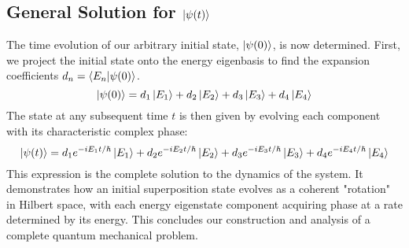 \documentclass[11pt,a4paper]{article}
\begin{document}
\subsection{General Solution for \texorpdfstring{$\ket{\psi(t)}$}{psi(t)}}

The time evolution of our arbitrary initial state, $\ket{\psi(0)}$, is now determined. First, we project the initial state onto the energy eigenbasis to find the expansion coefficients $d_n = \braket{E_n}{\psi(0)}$.
$$
\ket{\psi(0)} = d_1\ket{E_1} + d_2\ket{E_2} + d_3\ket{E_3} + d_4\ket{E_4}
$$
The state at any subsequent time $t$ is then given by evolving each component with its characteristic complex phase:
$$
\ket{\psi(t)} = d_1 e^{-iE_1 t/\hbar}\ket{E_1} + d_2 e^{-iE_2 t/\hbar}\ket{E_2} + d_3 e^{-iE_3 t/\hbar}\ket{E_3} + d_4 e^{-iE_4 t/\hbar}\ket{E_4}
$$
This expression is the complete solution to the dynamics of the system. It demonstrates how an initial superposition state evolves as a coherent "rotation" in Hilbert space, with each energy eigenstate component acquiring phase at a rate determined by its energy. This concludes our construction and analysis of a complete quantum mechanical problem.
\end{document}
